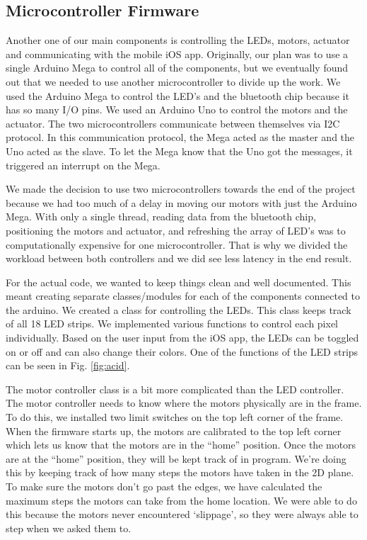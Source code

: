 \documentclass[11pt]{IEEEtran}
\begin{document}
\subsection{Microcontroller Firmware}
Another one of our main components is controlling the LEDs, motors, actuator and communicating with the mobile iOS app. Originally, our plan was to use a single Arduino Mega to control all of the components, but we eventually found out that we needed to use another microcontroller to divide up the work. We used the Arduino Mega to control the LED’s and the bluetooth chip because it has so many I/O pins.  We used an Arduino Uno to control the motors and the actuator. The two microcontrollers communicate between themselves via I2C protocol. In this communication protocol, the Mega acted as the master and the Uno acted as the slave. To let the Mega know that the Uno got the messages, it triggered an interrupt on the Mega.

We made the decision to use two microcontrollers towards the end of the project because we had too much of a delay in moving our motors with just the Arduino Mega.  With only a single thread, reading data from the bluetooth chip, positioning the motors and actuator, and refreshing the array of LED’s was to computationally expensive for one microcontroller. That is why we divided the workload between both controllers and we did see less latency in the end result.

For the actual code, we wanted to keep things clean and well documented. This meant creating separate classes/modules for each of the components connected to the arduino. We created a class for controlling the LEDs. This class keeps track of all 18 LED strips. We implemented various functions to control each pixel individually. Based on the user input from the iOS app, the LEDs can be toggled on or off and can also change their colors. One of the functions of the LED strips can be seen in Fig. \ref{fig:acid}.

The motor controller class is a bit more complicated than the LED controller. The motor controller needs to know where the motors physically are in the frame. To do this, we installed two limit switches on the top left corner of the frame. When the firmware starts up, the motors are calibrated to the top left corner which lets us know that the motors are in the “home” position. Once the motors are at the “home” position, they will be kept track of in program. We’re doing this by keeping track of how many steps the motors have taken in the 2D plane. To make sure the motors don’t go past the edges, we have calculated the maximum steps the motors can take from the home location. We were able to do this because the motors never encountered ‘slippage’, so they were always able to step when we asked them to.
\end{document}
